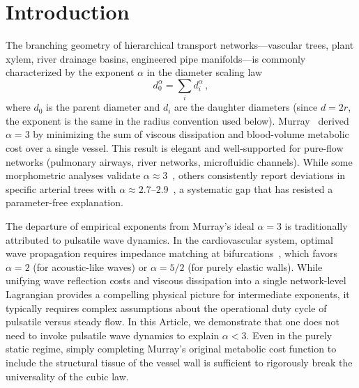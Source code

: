 \documentclass[11pt,a4paper]{article}
\theoremstyle{remark}
\begin{document}
\newpage

\section{Introduction}
\label{sec:intro}

The branching geometry of hierarchical transport networks---vascular trees,
plant xylem, river drainage basins, engineered pipe manifolds---is commonly
characterized by the exponent $\alpha$ in the diameter scaling law
\begin{equation}
  d_0^\alpha = \sum_i d_i^\alpha\,,
  \label{eq:murray}
\end{equation}
where $d_0$ is the parent diameter and $d_i$ are the daughter diameters
(since $d=2r$, the exponent is the same in the radius convention used below).
Murray~\cite{Murray1926} derived $\alpha=3$ by minimizing the sum of viscous
dissipation and blood-volume metabolic cost over a single vessel.
This result is elegant and well-supported for pure-flow networks (pulmonary
airways, river networks, microfluidic channels). While some morphometric analyses 
validate $\alpha \approx 3$~\cite{Huo2012}, others consistently report deviations 
in specific arterial trees with $\alpha\approx2.7$--$2.9$~\cite{Kassab1993,
Huang1996}, a systematic gap that has resisted a parameter-free explanation.

The departure of empirical exponents from Murray's ideal $\alpha=3$ is
traditionally attributed to pulsatile wave dynamics. In the cardiovascular
system, optimal wave propagation requires impedance matching at
bifurcations~\cite{Westerhof2010}, which favors $\alpha=2$ (for acoustic-like
waves) or $\alpha=5/2$ (for purely elastic walls). While unifying wave
reflection costs and viscous dissipation into a single network-level
Lagrangian provides a compelling physical picture for intermediate exponents,
it typically requires complex assumptions about the operational duty cycle of
pulsatile versus steady flow. In this Article, we demonstrate that one does
not need to invoke pulsatile wave dynamics to explain $\alpha < 3$. Even in
the purely static regime, simply completing Murray's original metabolic cost
function to include the structural tissue of the vessel wall is sufficient
to rigorously break the universality of the cubic law.
\end{document}
